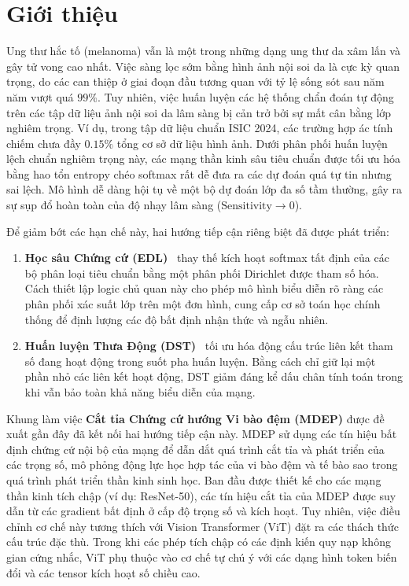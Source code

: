 \documentclass[11pt]{article}
\begin{document}
\section{Giới thiệu}\label{sec:intro}

Ung thư hắc tố (melanoma) vẫn là một trong những dạng ung thư da xâm lấn và gây tử vong cao nhất. Việc sàng lọc sớm bằng hình ảnh nội soi da là cực kỳ quan trọng, do các can thiệp ở giai đoạn đầu tương quan với tỷ lệ sống sót sau năm năm vượt quá $99\%$. Tuy nhiên, việc huấn luyện các hệ thống chẩn đoán tự động trên các tập dữ liệu ảnh nội soi da lâm sàng bị cản trở bởi sự mất cân bằng lớp nghiêm trọng. Ví dụ, trong tập dữ liệu chuẩn ISIC 2024, các trường hợp ác tính chiếm chưa đầy $0.15\%$ tổng cơ sở dữ liệu hình ảnh. Dưới phân phối huấn luyện lệch chuẩn nghiêm trọng này, các mạng thần kinh sâu tiêu chuẩn được tối ưu hóa bằng hao tổn entropy chéo softmax rất dễ đưa ra các dự đoán quá tự tin nhưng sai lệch. Mô hình dễ dàng hội tụ về một bộ dự đoán lớp đa số tầm thường, gây ra sự sụp đổ hoàn toàn của độ nhạy lâm sàng ($\text{Sensitivity} \to 0$).

Để giảm bớt các hạn chế này, hai hướng tiếp cận riêng biệt đã được phát triển:
\begin{enumerate}[label=(\roman*)]
    \item \textbf{Học sâu Chứng cứ (EDL)}~\cite{sensoy2018evidential} thay thế kích hoạt softmax tất định của các bộ phân loại tiêu chuẩn bằng một phân phối Dirichlet được tham số hóa. Cách thiết lập logic chủ quan này cho phép mô hình biểu diễn rõ ràng các phân phối xác suất lớp trên một đơn hình, cung cấp cơ sở toán học chính thống để định lượng các độ bất định nhận thức và ngẫu nhiên.
    \item \textbf{Huấn luyện Thưa Động (DST)}~\cite{evci2020rigging} tối ưu hóa động cấu trúc liên kết tham số đang hoạt động trong suốt pha huấn luyện. Bằng cách chỉ giữ lại một phần nhỏ các liên kết hoạt động, DST giảm đáng kể dấu chân tính toán trong khi vẫn bảo toàn khả năng biểu diễn của mạng.
\end{enumerate}

Khung làm việc \textbf{Cắt tỉa Chứng cứ hướng Vi bào đệm (MDEP)} được đề xuất gần đây đã kết nối hai hướng tiếp cận này. MDEP sử dụng các tín hiệu bất định chứng cứ nội bộ của mạng để dẫn dắt quá trình cắt tỉa và phát triển của các trọng số, mô phỏng động lực học hợp tác của vi bào đệm và tế bào sao trong quá trình phát triển thần kinh sinh học. Ban đầu được thiết kế cho các mạng thần kinh tích chập (ví dụ: ResNet-50), các tín hiệu cắt tỉa của MDEP được suy dẫn từ các gradient bất định ở cấp độ trọng số và kích hoạt. Tuy nhiên, việc điều chỉnh cơ chế này tương thích với Vision Transformer (ViT) đặt ra các thách thức cấu trúc đặc thù. Trong khi các phép tích chập có các định kiến quy nạp không gian cứng nhắc, ViT phụ thuộc vào cơ chế tự chú ý với các dạng hình token biến đổi và các tensor kích hoạt số chiều cao.
\end{document}
